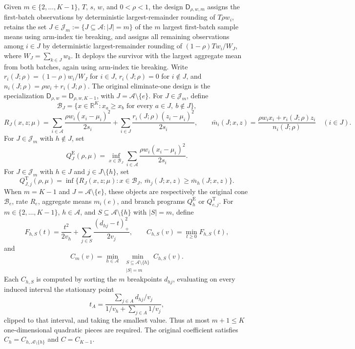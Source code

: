 Given \(m\in\{2,\ldots,K-1\}\), \(T\), \(s\), \(w\), and \(0<\rho<1\), the design \(\mathsf D_{\rho,w,m}\) assigns the first-batch observations by deterministic largest-remainder rounding of \(T\rho w_i\), retains the set \(J\in\mathcal J_m:=\{J\subseteq\mathcal A:|J|=m\}\) of the \(m\) largest first-batch sample means using arm-index tie breaking, and assigns all remaining observations among \(i\in J\) by deterministic largest-remainder rounding of \((1-\rho)T w_i/W_J\), where \(W_J=\sum_{k\in J}w_k\). It deploys the survivor with the largest aggregate mean from both batches, again using arm-index tie breaking. Write \(r_i(J;\rho)=(1-\rho)w_i/W_J\) for \(i\in J\), \(r_i(J;\rho)=0\) for \(i\notin J\), and \(n_i(J;\rho)=\rho w_i+r_i(J;\rho)\). The original eliminate-one design is the specialization \(\mathsf D_{\rho,w}=\mathsf D_{\rho,w,K-1}\), with \(J=\mathcal A\setminus\{e\}\).
For \(J\in\mathcal J_m\), define
\[
 \mathcal B_J=\{x\in\mathbb R^K:x_a\ge x_b\text{ for every }a\in J,\ b\notin J\},
\]
\[
 R_J(x,z;\mu)=\sum_{i\in\mathcal A}\frac{\rho w_i(x_i-\mu_i)^2}{2s_i}
 +\sum_{i\in J}\frac{r_i(J;\rho)(z_i-\mu_i)^2}{2s_i},
 \qquad
 \bar m_i(J;x,z)=\frac{\rho w_i x_i+r_i(J;\rho)z_i}{n_i(J;\rho)}\quad(i\in J).
\]
For \(J\in\mathcal J_m\) with \(h\notin J\), set
\[
 Q_J^{\mathrm E}(\rho,\mu)=\inf_{x\in\mathcal B_J}
 \sum_{i\in\mathcal A}\frac{\rho w_i(x_i-\mu_i)^2}{2s_i}.
\]
For \(J\in\mathcal J_m\) with \(h\in J\) and \(j\in J\setminus\{h\}\), set
\[
 Q_{J,j}^{\mathrm T}(\rho,\mu)=
 \inf\{R_J(x,z;\mu):x\in\mathcal B_J,\ \bar m_j(J;x,z)\ge \bar m_h(J;x,z)\}.
\]
When \(m=K-1\) and \(J=\mathcal A\setminus\{e\}\), these objects are respectively the original cone \(\mathcal B_e\), rate \(R_e\), aggregate means \(m_i(e)\), and branch programs \(Q_h^{\mathrm E}\) or \(Q_{e,j}^{\mathrm T}\).
For \(m\in\{2,\ldots,K-1\}\), \(h\in\mathcal A\), and \(S\subseteq\mathcal A\setminus\{h\}\) with \(|S|=m\), define
\[
 F_{h,S}(t)=\frac{t^2}{2v_h}+\sum_{j\in S}\frac{(d_{hj}-t)_+^2}{2v_j},
 \qquad C_{h,S}(v)=\min_{t\ge0}F_{h,S}(t),
\]
and
\[
 C_m(v)=\min_{h\in\mathcal A}\ \min_{\substack{S\subseteq\mathcal A\setminus\{h\}\\|S|=m}}C_{h,S}(v).
\]
Each \(C_{h,S}\) is computed by sorting the \(m\) breakpoints \(d_{hj}\), evaluating on every induced interval the stationary point
\[
 t_A=\frac{\sum_{j\in A}d_{hj}/v_j}{1/v_h+\sum_{j\in A}1/v_j},
\]
clipped to that interval, and taking the smallest value. Thus at most \(m+1\le K\) one-dimensional quadratic pieces are required. The original coefficient satisfies \(C_h=C_{h,\mathcal A\setminus\{h\}}\) and \(C=C_{K-1}\).
